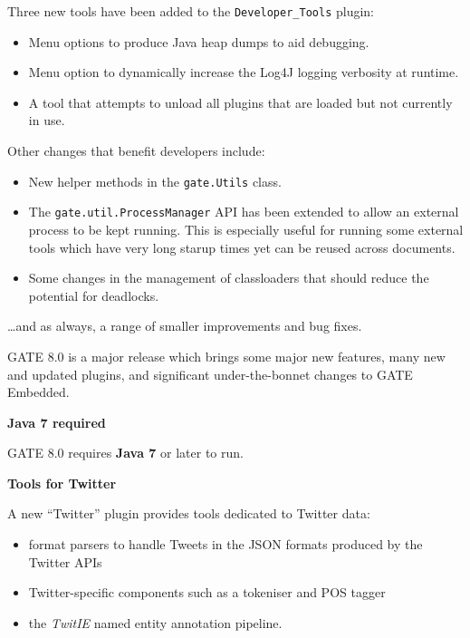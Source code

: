 
Three new tools have been added to the \verb!Developer_Tools! plugin:

\begin{itemize}
\item Menu options to produce Java heap dumps to aid debugging.
\item Menu option to dynamically increase the Log4J logging verbosity
  at runtime.
\item A tool that attempts to unload all plugins that are loaded but not
  currently in use.
\end{itemize}

Other changes that benefit developers include:
\begin{itemize}
\item New helper methods in the \verb!gate.Utils! class.
\item The \verb!gate.util.ProcessManager! API has been extended to allow an
  external process to be kept running.  This is especially useful for running
  some external tools which have very long starup times yet can be reused
  across documents.
\item Some changes in the management of classloaders that should reduce the
  potential for deadlocks.
\end{itemize}

\ldots and as always, a range of smaller improvements and bug fixes.


GATE 8.0 is a major release which brings some major new features, many new and
updated plugins, and significant under-the-bonnet changes to GATE Embedded.


\textbf{Java 7 required}

GATE 8.0 requires \textbf{Java 7} or later to run.

\textbf{Tools for Twitter}

A new ``Twitter'' plugin provides tools dedicated to Twitter data:
\begin{itemize}
\item format parsers to handle Tweets in the JSON formats produced by the
  Twitter APIs
\item Twitter-specific components such as a tokeniser and POS tagger
\item the \emph{TwitIE} named entity annotation pipeline.
\end{itemize}

